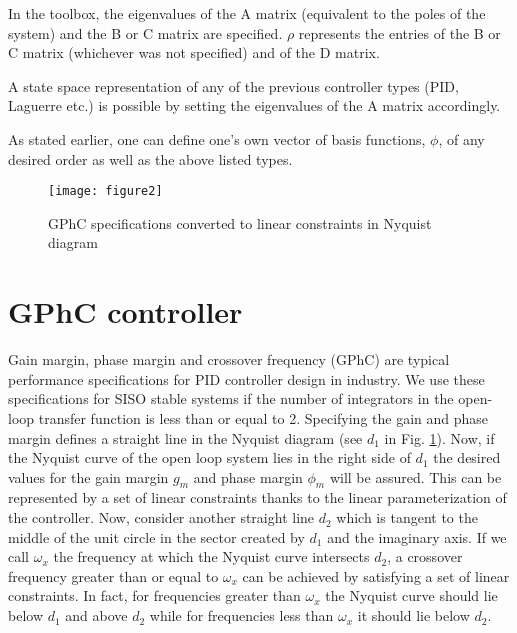 \documentclass [12pt , a4paper] {report}
\begin{document}
In the toolbox, the eigenvalues of the A matrix (equivalent to the poles of the system) and the B or C matrix are specified. $\rho$ represents the entries of the B or C matrix (whichever was not specified) and of the D matrix.

A state space representation of any of the previous controller types (PID, Laguerre etc.) is possible by setting the eigenvalues of the A matrix accordingly.





As stated earlier, one can define one's own vector of basis functions, $\phi$, of any desired order as well as the above listed types.

\begin{figure}
\centering
{}
\texttt{[image: figure2]}
\caption{GPhC specifications converted to linear constraints in Nyquist diagram}
\label{fig:GPhC}
\end{figure}

\section{GPhC controller}
Gain margin, phase margin and crossover frequency (GPhC) are typical performance specifications for PID controller design in industry. We use these specifications for SISO stable systems if the number of integrators in the open-loop transfer function is less than or equal to 2. Specifying the gain and phase margin defines a straight line in the Nyquist diagram (see $d_1$ in Fig. \ref{fig:GPhC}). Now, if the Nyquist curve of the open loop system lies in the right side of $d_1$ the desired values for the gain margin $g_m$ and phase margin $\phi_m$ will be assured. This can be represented by a set of linear constraints thanks to the linear parameterization of the controller. Now, consider another straight line $d_2$ which is tangent to the middle of the unit circle in the sector created by $d_1$ and the imaginary axis. If we call $\omega_x$ the frequency at which the Nyquist curve intersects $d_2$, a crossover frequency greater than or equal to $\omega_x$ can be achieved by satisfying a set of linear constraints. In fact, for frequencies greater than $\omega_x$ the Nyquist curve should lie below $d_1$ and above $d_2$ while for frequencies less than $\omega_x$ it should lie below $d_2$.
\end{document}
